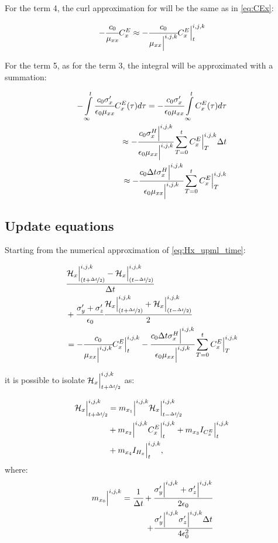 For the term 4, the curl approximation for will be the same as in \eqref{eq:CEx}:

\begin{align}
    -\cfrac{c_0}{\mu_{xx}}C_x^E \approx -\cfrac{c_0}{\mu_{xx}\Big|^{i,j,k}}C_x^E\Big|^{i,j,k}_{t}
\end{align}

For the term 5, as for the term 3, the integral will be approximated with a summation:

\begin{align}
    - \int\limits_{\infty}^t\cfrac{c_0\sigma_x^{\prime}}{\epsilon_0\mu_{xx}}C_x^E(\tau)d\tau = - \cfrac{c_0\sigma_x^{\prime}}{\epsilon_0\mu_{xx}} \int\limits_{\infty}^tC_x^E(\tau)d\tau \nonumber \\
    \approx - \cfrac{c_0\sigma_x^H\Big|^{i,j,k}}{\epsilon_0\mu_{xx}\Big|^{i,j,k}} \sum\limits_{T=0}^{t}C_x^E\Big|^{i,j,k}_{T}\Delta t \nonumber \\
    \approx - \cfrac{c_0\Delta t\sigma_x^H\Big|^{i,j,k}}{\epsilon_0\mu_{xx}\Big|^{i,j,k}} \sum\limits_{T=0}^{t}C_x^E\Big|^{i,j,k}_{T}
\end{align}

\subsection{Update equations}

Starting from the numerical approximation of \eqref{eq:Hx_upml_time}:

\begin{small}
    \begin{align}
        &\cfrac{\mathcal{H}_x\Big|_{(t+\nicefrac{\Delta t}{2})}^{i,j,k}-\mathcal{H}_x\Big|^{i,j,k}_{(t-\nicefrac{\Delta t}{2})}}{\Delta t} \nonumber \\ 
        &+ \cfrac{\sigma_y^{\prime} + \sigma_z^{\prime}}{\epsilon_0}\cfrac{\mathcal{H}_x\Big|_{(t+\nicefrac{\Delta t}{2})}^{i,j,k}+\mathcal{H}_x\Big|^{i,j,k}_{(t-\nicefrac{\Delta t}{2})}}{2}  \nonumber \\
        &= -\cfrac{c_0}{\mu_{xx}\Big|^{i,j,k}}C_x^E\Big|^{i,j,k}_{t} - \cfrac{c_0\Delta t\sigma_x^H\Big|^{i,j,k}}{\epsilon_0\mu_{xx}\Big|^{i,j,k}} \sum\limits_{T=0}^{t}C_x^E\Big|^{i,j,k}_{T}
    \end{align}
\end{small}
it is possible to isolate $ \mathcal{H}_x\Big|_{t+\nicefrac{\Delta t}{2}}^{i,j,k}$ as:

\begin{align}
    \mathcal{H}_x\Big|_{t+\nicefrac{\Delta t}{2}}^{i,j,k} &= m_{{x_1}}\Big|^{i,j,k} \mathcal{H}_x\Big|_{t-\nicefrac{\Delta t}{2}}^{i,j,k} 
    \nonumber \\
    & + m_{{x_2}}\Big|^{i,j,k}C_x^E\Big|^{i,j,k}_{t} + m_{{x_3}} I_{C^E_x}\Big|^{i,j,k}_{t} 
    \nonumber \\
    &+ m_{{x_4}} I_{H_x}\Big|^{i,j,k}_{t},
\end{align}
where:
\begin{align}
    m_{{x_0}}\Big|^{i,j,k} = \cfrac{1}{\Delta t} + \cfrac{\sigma_y^{\prime}\Big|^{i,j,k} + \sigma_z^{\prime}\Big|^{i,j,k}}{2\epsilon_0} \nonumber\\ + \cfrac{\sigma_y^{\prime}\Big|^{i,j,k}  \sigma_z^{\prime}\Big|^{i,j,k} \Delta t}{4\epsilon_0^2}
\end{align}

